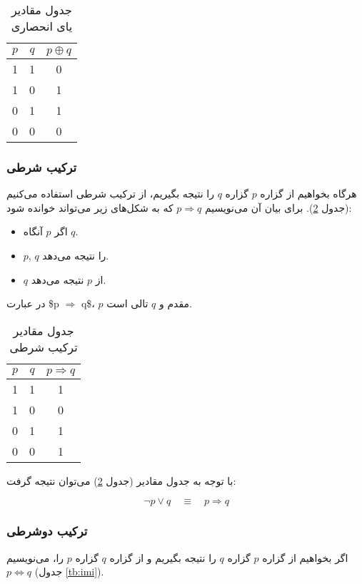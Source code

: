 \documentclass[a4paper]{article}
\begin{document}
\begin{table}[htbp]
\caption{\label{tb:xor}جدول مقادیر یای انحصاری}
\centering
\begin{tabular}{cc|c}
\(p\) & \(q\) & \(p \oplus q\)\\
\hline
1 & 1 & 0\\
1 & 0 & 1\\
0 & 1 & 1\\
0 & 0 & 0\\
\end{tabular}
\end{table}

\subsubsection{ترکیب شرطی}
\label{sec:org6e20e9f}
هرگاه بخواهیم از گزاره \(p\) گزاره \(q\) را نتیجه بگیریم، از ترکیب شرطی استفاده می‌کنیم (جدول \ref{tb:imp}). برای بیان آن می‌نویسیم \(p \Rightarrow q\) که به شکل‌های زیر می‌تواند خوانده شود:
\begin{itemize}
\item اگر \(p\) آنگاه \(q\).
\item \(p\), \(q\) را نتیجه می‌دهد.
\item \(q\) از \(p\) نتیجه می‌دهد.
\end{itemize}
در عبارت \$p \(\Rightarrow\) q\$، \(p\) مقدم و \(q\) تالی است.

\begin{table}[htbp]
\caption{\label{tb:imp}جدول مقادیر ترکیب شرطی}
\centering
\begin{tabular}{cc|c}
\(p\) & \(q\) & \(p \Rightarrow q\)\\
\hline
1 & 1 & 1\\
1 & 0 & 0\\
0 & 1 & 1\\
0 & 0 & 1\\
\end{tabular}
\end{table}

با توجه به جدول مقادیر (جدول \ref{tb:imp}) می‌توان نتیجه گرفت:

\begin{equation}
\lnot p \lor q \quad \equiv \quad p \Rightarrow q
\end{equation}

\subsubsection{ترکیب دوشرطی}
\label{sec:org6c1bab4}
اگر بخواهیم از گزاره \(p\) گزاره \(q\) را نتیجه بگیریم و از گزاره \(q\) گزاره \(p\) را، می‌نویسیم \(p \Leftrightarrow q\) (جدول \ref{tb:imi}).
\end{document}
